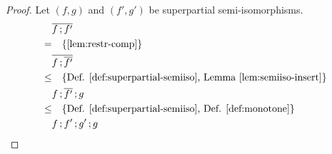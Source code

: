 \documentclass[runningheads,envcountsame]{llncs}
\begin{document}
\begin{proof}
    Let $(f, g)$ and $(f', g')$ be superpartial semi-isomorphisms.
    \begin{align}
        & \overline{\comp{f}{f'}} \\
    =   & \quad\text{\{\ref{lem:restr-comp}\}} \\
        & \overline{\comp{f}{\overline{f'}}} \\
    \leq & \quad\text{\{Def. \ref{def:superpartial-semiiso}, Lemma \ref{lem:semiiso-insert}\}} \\
        & \comp{\comp{f}{\overline{f'}}}{g} \\
    \leq & \quad\text{\{Def. \ref{def:superpartial-semiiso}, Def. \ref{def:monotone}\}} \\
        & \comp{\comp{f}{\comp{f'}{g'}}}{g}
    \end{align}
\end{proof}
\end{document}
